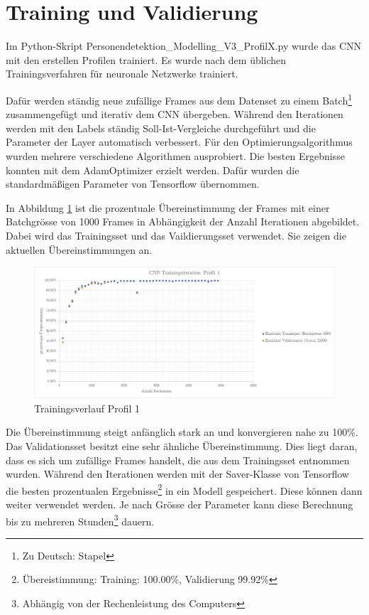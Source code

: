 \newpage
\section{Training und Validierung}
\label{TrainingValidierung}

Im Python-Skript Personendetektion\_Modelling\_V3\_ProfilX.py wurde das \ac{CNN} mit den erstellen Profilen trainiert. Es wurde nach dem üblichen Trainingsverfahren für neuronale Netzwerke trainiert.

Dafür werden ständig neue zufällige Frames aus dem Datenset zu einem Batch\footnote[29]{Zu Deutsch: Stapel} zusammengefügt und iterativ dem \ac{CNN} übergeben. Während den Iterationen werden mit den Labels ständig Soll-Ist-Vergleiche durchgeführt und die Parameter der Layer automatisch verbessert. 
Für den Optimierungsalgorithmus wurden mehrere verschiedene Algorithmen ausprobiert. Die besten Ergebnisse konnten mit dem AdamOptimizer erzielt werden. Dafür wurden die standardmäßigen Parameter von Tensorflow übernommen.

In Abbildung \ref{fig:traininsverlauf} ist die prozentuale Übereinstimmung der Frames mit einer Batchgrösse von 1000 Frames in Abhängigkeit der Anzahl Iterationen abgebildet. Dabei wird das Trainingsset und das Vaildierungsset verwendet. Sie zeigen die aktuellen Übereinstimmungen an. 

\begin{figure}[H]
	\centering
	\caption[Trainingsverlauf Profil 1]{Trainingsverlauf Profil 1}
	\label{fig:traininsverlauf}
	\includegraphics[width=1.0\linewidth]{fig/Traininsverlauf}
\end{figure}

Die Übereinstimmung steigt anfänglich stark an und konvergieren nahe zu 100\%. Das Validationsset besitzt eine sehr ähnliche Übereinstimmung. Dies liegt daran, dass es sich um zufällige Frames handelt, die aus dem Trainingsset entnommen wurden. Während den Iterationen werden mit der Saver-Klasse von Tensorflow die besten prozentualen Ergebnisse\footnote[30]{Übereistimmung: Training: 100.00\%, Validierung 99.92\%}  in ein Modell gespeichert. Diese können dann weiter verwendet werden. Je nach Grösse der Parameter kann diese Berechnung bis zu mehreren Stunden\footnote[31]{Abhängig von der Rechenleistung des Computers} dauern. 


